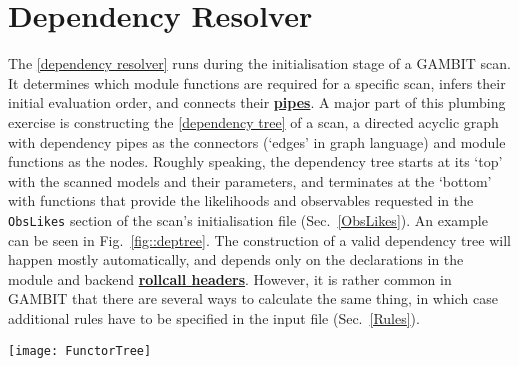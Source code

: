 \documentclass[pdftex,twocolumn,epjc3_preprint,runningheads]{svjour3}
\renewcommand{\_}{\discretionary{\underscore}{}{\underscore}}
\newcommand\yaml[1]{{\lstset{style=yaml}\lstinline!#1!\lstset{style=cpp}}}
\newcommand\term[1]{{\lstset{style=terminal}\lstinline!#1!\lstset{style=cpp}}}
\newcommand{\cross}[1]{\ref{#1}}
\newcommand{\doublecross}[2]{\hyperref[#2]{\textbf{#1}}}
\newcommand{\gambit}{\textsf{GAMBIT}\xspace}
\newcommand{\GB}{\gambit}
\newcommand\YAML{\textsf{YAML}\xspace}
\begin{document}
\section{Dependency Resolver}
\label{depresolver}

The \cross{dependency resolver} runs during the initialisation stage of a \GB scan.
It determines which module functions are required for a specific scan, infers
their initial evaluation order, and connects their \doublecross{pipes}{pipe}.  A major part of this plumbing exercise is constructing the \cross{dependency tree} of a scan, a
directed acyclic graph with dependency pipes as the connectors (`edges' in graph language) and module functions as the nodes.
Roughly speaking, the dependency tree starts at its `top' with the scanned
models and their parameters, and terminates at the `bottom' with functions that provide the likelihoods
and observables requested in the \yaml{ObsLikes} section of the scan's initialisation file (Sec.\ \ref{ObsLikes}).  An example can be seen in Fig.\ \ref{fig::deptree}. The construction of a
valid dependency tree will happen mostly automatically, and depends only on the
declarations in the module and backend \doublecross{rollcall headers}{rollcall
header}.  However, it is rather common in \GB that there are several ways to
calculate the same thing, in which case additional rules have to be specified
in the input file (Sec.\ \ref{Rules}).

\begin{figure*}[tp]
\centering
\texttt{[image: FunctorTree]}
\caption{An example \protect\cross{dependency tree} generated in the initialisation stage of a \GB scan.  Each block corresponds to a single \protect\cross{module function}, with the red text indicating its \cross{capability}.
Arrows indicate resolution of \doublecross{dependencies}{dependency} of different module functions with the results of others.  The functions selected by the \protect\cross{dependency resolver} to provide the observables and likelihoods requested in the \protect\yaml{ObsLikes} section of the scan's input \YAML file are shaded in green.  Module functions shown shaded in purple are \protect\doublecross{nested module functions}{nested module function}.  These run in an automatically-parallelised loop managed by a \protect\cross{loop manager} function, which is shown shaded in blue.  This example is included in the \GB distribution as \protect\term{spartan.yaml}; see Sec.\ \protect\ref{examples} for more details.  Figures like this can be generated for any scan by following the instructions provided after calling \GB with the \protect\term{-d} switch; see Sec.\ \protect\ref{switches} for details.}
\label{fig::deptree}
\end{figure*}
\end{document}
